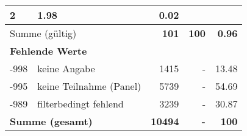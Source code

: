 \begin{longtable}{lXrrr}
       \num{2} &
       \num[round-mode=places,round-precision=2]{1.98} &
         \num[round-mode=places,round-precision=2]{0.02} \\
     \midrule
     \multicolumn{2}{l}{Summe (gültig)} &
       \textbf{\num{101}} &
     \textbf{\num{100}} &
       \textbf{\num[round-mode=places,round-precision=2]{0.96}} \\
     \multicolumn{5}{l}{\textbf{Fehlende Werte}}\\
       -998 &
       keine Angabe &
         \num{1415} &
        - &
         \num[round-mode=places,round-precision=2]{13.48} \\
       -995 &
       keine Teilnahme (Panel) &
         \num{5739} &
        - &
         \num[round-mode=places,round-precision=2]{54.69} \\
       -989 &
       filterbedingt fehlend &
         \num{3239} &
        - &
         \num[round-mode=places,round-precision=2]{30.87} \\
     \midrule
     \multicolumn{2}{l}{\textbf{Summe (gesamt)}} &
          \textbf{\num{10494}} &
        \textbf{-} &
        \textbf{\num{100}} \\
     \bottomrule
     \end{longtable}
     
